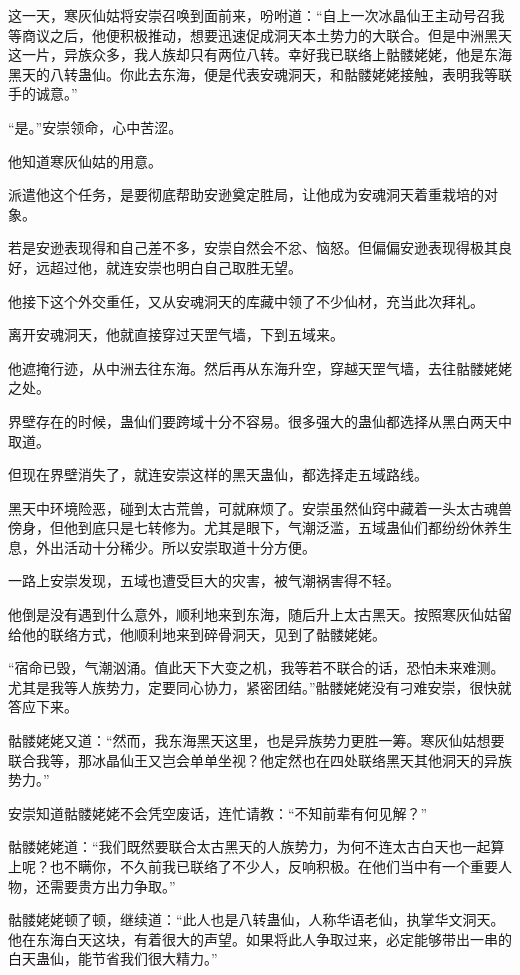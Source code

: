 \begin{this_body}
这一天，寒灰仙姑将安崇召唤到面前来，吩咐道：“自上一次冰晶仙王主动号召我等商议之后，他便积极推动，想要迅速促成洞天本土势力的大联合。但是中洲黑天这一片，异族众多，我人族却只有两位八转。幸好我已联络上骷髅姥姥，他是东海黑天的八转蛊仙。你此去东海，便是代表安魂洞天，和骷髅姥姥接触，表明我等联手的诚意。”

“是。”安崇领命，心中苦涩。

他知道寒灰仙姑的用意。

派遣他这个任务，是要彻底帮助安逊奠定胜局，让他成为安魂洞天着重栽培的对象。

若是安逊表现得和自己差不多，安崇自然会不忿、恼怒。但偏偏安逊表现得极其良好，远超过他，就连安崇也明白自己取胜无望。

他接下这个外交重任，又从安魂洞天的库藏中领了不少仙材，充当此次拜礼。

离开安魂洞天，他就直接穿过天罡气墙，下到五域来。

他遮掩行迹，从中洲去往东海。然后再从东海升空，穿越天罡气墙，去往骷髅姥姥之处。

界壁存在的时候，蛊仙们要跨域十分不容易。很多强大的蛊仙都选择从黑白两天中取道。

但现在界壁消失了，就连安崇这样的黑天蛊仙，都选择走五域路线。

黑天中环境险恶，碰到太古荒兽，可就麻烦了。安崇虽然仙窍中藏着一头太古魂兽傍身，但他到底只是七转修为。尤其是眼下，气潮泛滥，五域蛊仙们都纷纷休养生息，外出活动十分稀少。所以安崇取道十分方便。

一路上安崇发现，五域也遭受巨大的灾害，被气潮祸害得不轻。

他倒是没有遇到什么意外，顺利地来到东海，随后升上太古黑天。按照寒灰仙姑留给他的联络方式，他顺利地来到碎骨洞天，见到了骷髅姥姥。

“宿命已毁，气潮汹涌。值此天下大变之机，我等若不联合的话，恐怕未来难测。尤其是我等人族势力，定要同心协力，紧密团结。”骷髅姥姥没有刁难安崇，很快就答应下来。

骷髅姥姥又道：“然而，我东海黑天这里，也是异族势力更胜一筹。寒灰仙姑想要联合我等，那冰晶仙王又岂会单单坐视？他定然也在四处联络黑天其他洞天的异族势力。”

安崇知道骷髅姥姥不会凭空废话，连忙请教：“不知前辈有何见解？”

骷髅姥姥道：“我们既然要联合太古黑天的人族势力，为何不连太古白天也一起算上呢？也不瞒你，不久前我已联络了不少人，反响积极。在他们当中有一个重要人物，还需要贵方出力争取。”

骷髅姥姥顿了顿，继续道：“此人也是八转蛊仙，人称华语老仙，执掌华文洞天。他在东海白天这块，有着很大的声望。如果将此人争取过来，必定能够带出一串的白天蛊仙，能节省我们很大精力。”


\end{this_body}
